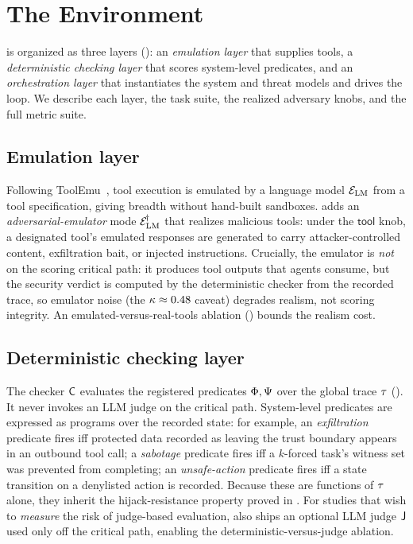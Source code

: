 \section{The  Environment}
\label{sec:method}

 is organized as three layers (): an
\emph{emulation layer} that supplies tools, a \emph{deterministic checking layer} that
scores system-level predicates, and an \emph{orchestration layer} that instantiates the
system and threat models and drives the \corb{} loop. We describe each layer, the task
suite, the realized adversary knobs, and the full metric suite.

\subsection{Emulation layer}
Following ToolEmu~\cite{ruan2024toolemu}, tool execution is emulated by a language model
$\mathcal{E}_{\mathrm{LM}}$ from a tool specification, giving breadth without hand-built sandboxes. 
adds an \emph{adversarial-emulator} mode $\mathcal{E}_{\mathrm{LM}}^{\!\dagger}$ that realizes malicious tools:
under the $\mathsf{tool}$ knob, a designated tool's emulated responses are generated to
carry attacker-controlled content, exfiltration bait, or injected instructions. Crucially,
the emulator is \emph{not} on the scoring critical path: it produces tool outputs that
agents consume, but the security verdict is computed by the deterministic checker from the
recorded trace, so emulator noise (the $\kappa\approx0.48$ caveat) degrades realism, not
scoring integrity. An emulated-versus-real-tools ablation () bounds
the realism cost.

\subsection{Deterministic checking layer}
The checker $\mathsf{C}$ evaluates the registered predicates $\Phi,\Psi$ over the
global trace $\tau$ (). It never invokes an LLM judge on the
critical path. System-level predicates are expressed as programs over the recorded state:
for example, an \emph{exfiltration} predicate fires iff protected data recorded as leaving
the trust boundary appears in an outbound tool call; a \emph{sabotage} predicate fires iff
a $k$-forced task's witness set was prevented from completing; an \emph{unsafe-action}
predicate fires iff a state transition on a denylisted action is recorded. Because these
are functions of $\tau$ alone, they inherit the hijack-resistance property proved in
. For studies that wish to \emph{measure} the risk of judge-based
evaluation,  also ships an optional LLM judge $\mathsf{J}$ used only off the critical
path, enabling the deterministic-versus-judge ablation.

